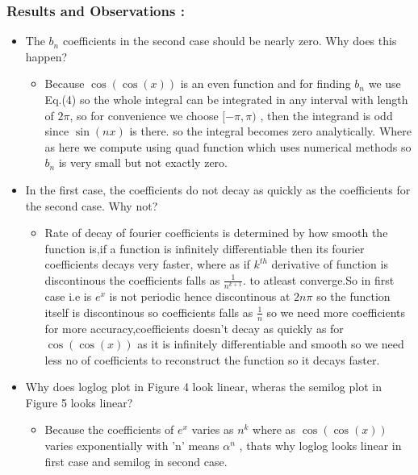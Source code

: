 \documentclass[11pt, a4paper]{article}
\begin{document}
\subsubsection{Results and Observations :}\label{results-and-observations}
\begin{itemize}
     \item
       The \(b_{n}\) coefficients in the second case should be nearly zero.
       Why does this happen?
       \begin{itemize}
          \item
       Because \(\cos(\cos(x))\) is an even function and for finding
       \(b_{n}\) we use Eq.(4) so the whole integral can be integrated in any
       interval with length of \(2\pi\), so for convenience we choose
       \([-\pi,\pi)\) , then the integrand is odd since \(\sin(nx)\) is
       there. so the integral becomes zero analytically. Where as here we
       compute using quad function which uses numerical methods so \(b_{n}\)
       is very small but not exactly zero.
       \end{itemize}
     \item
       In the first case, the coefficients do not decay as quickly as the
       coefficients for the second case. Why not?
          \begin{itemize}
          \item
       Rate of decay of fourier coefficients is determined by how smooth the
       function is,if a function is infinitely differentiable then its
       fourier coefficients decays very faster, where as if \(k^{th}\)
       derivative of function is discontinous the coefficients falls as
       \(\frac{1}{n^{k+1}}\). to atleast converge.So in first case i.e is
       \(e^{x}\) is not periodic hence discontinous at \(2n\pi\) so the
       function itself is discontinous so coefficients falls as
       \(\frac{1}{n}\) so we need more coefficients for more
       accuracy,coefficients doesn't decay as quickly as for
       \(\cos(\cos(x))\) as it is infinitely differentiable and smooth so we
       need less no of coefficients to reconstruct the function so it decays
       faster.
     \end{itemize}		
          
     \item
       Why does loglog plot in Figure 4 look linear, wheras the semilog plot
       in Figure 5 looks linear?
       \begin{itemize}
       \item
       Because the coefficients of \(e^{x}\) varies as \(n^{k}\) where as
       \(\cos(\cos(x))\) varies exponentially with 'n' means \(\alpha^{n}\) ,
       thats why loglog looks linear in first case and semilog in second
       case.
     \end{itemize}
       \end{itemize}
     \break
\end{document}
